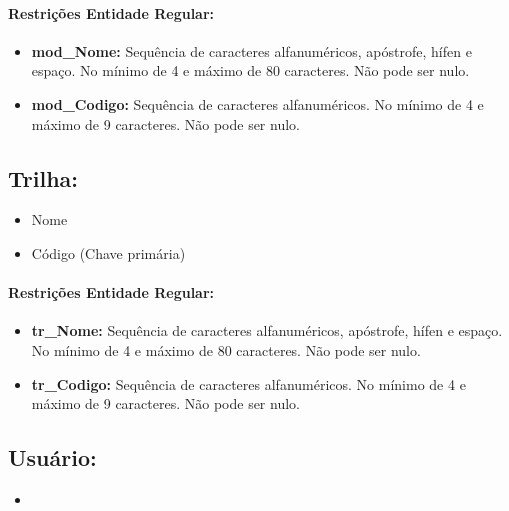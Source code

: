 \documentclass{report}
\begin{document}
\paragraph{Restrições Entidade Regular:}
\begin{itemize}
  \item \textbf{mod\_Nome:} Sequência de caracteres alfanuméricos, apóstrofe, hífen e espaço. No mínimo de 4 e máximo de 80 caracteres. Não pode ser nulo.
  \item \textbf{mod\_Codigo:} Sequência de caracteres alfanuméricos. No mínimo de 4 e máximo de 9 caracteres. Não pode ser nulo.
\end{itemize}


\subsection{Trilha:}
\begin{itemize}
  \item Nome
  \item Código (Chave primária)
\end{itemize}
\paragraph{Restrições Entidade Regular:}
\begin{itemize}
  \item \textbf{tr\_Nome:} Sequência de caracteres alfanuméricos, apóstrofe, hífen e espaço. No mínimo de 4 e máximo de 80 caracteres. Não pode ser nulo.
  \item \textbf{tr\_Codigo:} Sequência de caracteres alfanuméricos. No mínimo de 4 e máximo de 9 caracteres. Não pode ser nulo.
\end{itemize}

\subsection{Usuário:}
\begin{itemize}
  \item
\end{itemize}
\end{document}
